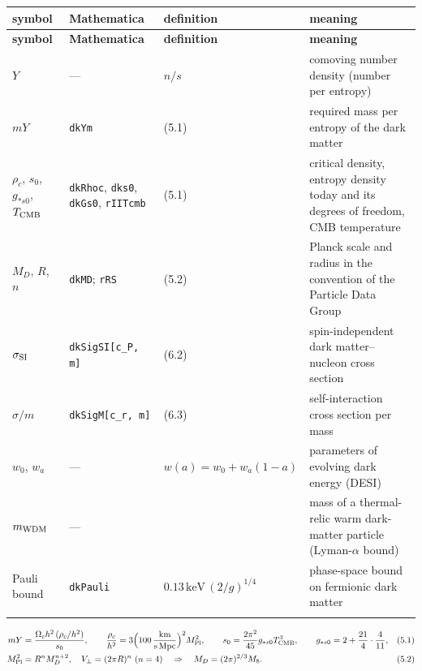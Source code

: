 \documentclass[10pt,a4paper]{article}
\begin{document}
{\small
\begin{longtable}{>{\raggedright\arraybackslash}p{}>{\raggedright\arraybackslash}p{}>{\raggedright\arraybackslash}p{}>{\raggedright\arraybackslash}p{}}
\toprule
\textbf{symbol} & \textbf{Mathematica} & \textbf{definition} & \textbf{meaning} \\
\midrule\endfirsthead
\toprule
\textbf{symbol} & \textbf{Mathematica} & \textbf{definition} & \textbf{meaning} \\
\midrule\endhead
\endfoot
\bottomrule\endlastfoot
$Y$ & — & $n/s$ & comoving number density (number per entropy) \\
$mY$ & \texttt{dkYm} & (5.1) & required mass per entropy of the dark matter \\
$\rho_c$, $s_0$, $g_{*s0}$, $T_{\rm CMB}$ & \texttt{dkRhoc}, \texttt{dks0}, \texttt{dkGs0}, \texttt{rIITcmb} & (5.1) & critical density, entropy density today and its degrees of freedom, CMB temperature \\
$M_D$, $R$, $n$ & \texttt{dkMD}; \texttt{rRS} & (5.2) & Planck scale and radius in the convention of the Particle Data Group \\
$\sigma_{\rm SI}$ & \texttt{dkSigSI[c\_\allowbreak{}P, m]} & (6.2) & spin-independent dark matter–nucleon cross section \\
$\sigma/m$ & \texttt{dkSigM[c\_\allowbreak{}r, m]} & (6.3) & self-interaction cross section per mass \\
$w_0$, $w_a$ & — & $w(a)=w_0+w_a(1-a)$ & parameters of evolving dark energy (DESI) \\
$m_{\rm WDM}$ & — &  & mass of a thermal-relic warm dark-matter particle (Lyman-$\alpha$ bound) \\
Pauli bound & \texttt{dkPauli} & $0.13\,\text{keV}\,(2/g)^{1/4}$ & phase-space bound on fermionic dark matter \\*
\end{longtable}}
\begin{align*}
mY&=\frac{\Omega_ch^2\,(\rho_c/h^2)}{s_0},\qquad \frac{\rho_c}{h^2}=3\Big(100\,\frac{\rm km}{\rm s\,Mpc}\Big)^2M_{\rm Pl}^2,\qquad s_0=\frac{2\pi^2}{45}g_{*s0}T_{\rm CMB}^3,\qquad g_{*s0}=2+\frac{21}4\cdot\frac4{11},&&(5.1) \\
M_{\rm Pl}^2&=R^nM_D^{n+2},\quad V_\perp=(2\pi R)^n\ (n=4)\quad\Rightarrow\quad M_D=(2\pi)^{2/3}M_8.&&(5.2)
\end{align*}
\end{document}
